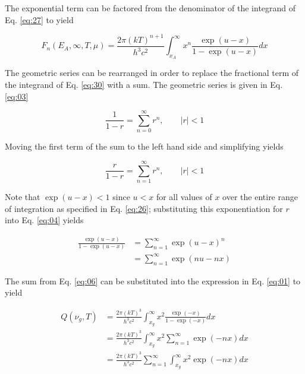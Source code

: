 \documentclass[letterpaper,12pt]{article}
\begin{document}
The exponential term can be factored from the denominator of the integrand of Eq. \ref{eq:27} to yield

\begin{equation} \label{eq:30}
F_{n}(E_{A},\infty,T,\mu) = \frac{2 \pi (kT)^{n+1}}{h^{3}c^{2}} \int_{x_{A}}^{\infty} x^{n} \frac{\exp(u-x)}{1 - \exp(u-x)} dx
\end{equation}


The geometric series can be rearranged in order to replace the fractional term of the integrand of Eq. \ref{eq:30} with a sum. The geometric series is given in Eq. \ref{eq:03}

\begin{equation} \label{eq:03}
\frac{1}{1-r} = \sum_{n = 0}^{\infty} r^{n}, \qquad |r| < 1
\end{equation}

\noindent Moving the first term of the sum to the left hand side and simplifying yields

\begin{equation} \label{eq:04}
\frac{r}{1-r} = \sum_{n = 1}^{\infty} r^{n}, \qquad |r| < 1
\end{equation}


Note that $\exp(u-x) < 1$ since $u < x$ for all values of $x$ over the entire range of integration as specified in Eq. \ref{eq:26}; substituting this exponentiation for $r$ into Eq. \ref{eq:04} yields

\begin{align} \label{eq:06}
\frac{\exp(u-x)}{1 - \exp(u-x)} &= \sum_{n = 1}^{\infty} \exp(u-x)^{n} \nonumber \\
 &= \sum_{n = 1}^{\infty} \exp(nu-nx)
\end{align}





The sum from Eq. \ref{eq:06} can be substituted into the expression in Eq. \ref{eq:01} to yield

\begin{align} \label{eq:07}
Q(\nu_{g}, T) &= \frac{2\pi (kT)^{3}}{h^{3} c^{2}} \int_{x_{g}}^{\infty} x^{2} \frac{\exp(-x)}{1 - \exp(-x)} dx \nonumber \\
 &= \frac{2\pi (kT)^{3}}{h^{3} c^{2}} \int_{x_{g}}^{\infty} x^{2} \sum_{n = 1}^{\infty} \exp(-nx) dx \nonumber \\
 &= \frac{2\pi (kT)^{3}}{h^{3} c^{2}} \sum_{n = 1}^{\infty} \int_{x_{g}}^{\infty} x^{2} \exp(-nx) dx
\end{align}
\end{document}
